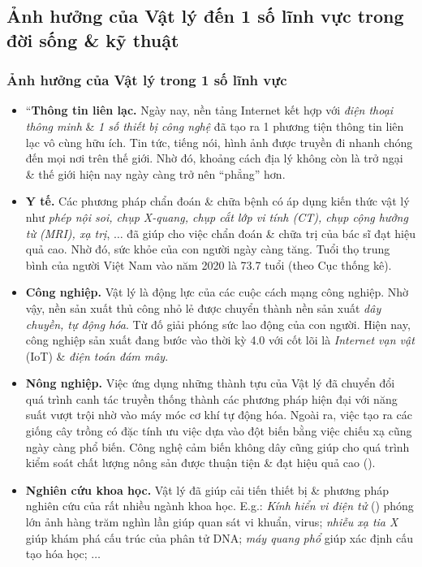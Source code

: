 \documentclass[oneside]{book}
\numberwithin{equation}{section}
\begin{document}
\subsection{Ảnh hưởng của Vật lý đến 1 số lĩnh vực trong đời sống \& kỹ thuật}

\subsubsection{Ảnh hưởng của Vật lý trong 1 số lĩnh vực}
\begin{itemize}
	\item ``\textbf{Thông tin liên lạc.} Ngày nay, nền tảng Internet kết hợp với \textit{điện thoại thông minh} \& \textit{1 số thiết bị công nghệ} đã tạo ra 1 phương tiện thông tin liên lạc vô cùng hữu ích. Tin tức, tiếng nói, hình ảnh được truyền đi nhanh chóng đến mọi nơi trên thế giới. Nhờ đó, khoảng cách địa lý không còn là trở ngại \& thế giới hiện nay ngày càng trở nên ``phẳng'' hơn.
	\item \textbf{Y tế.} Các phương pháp chẩn đoán \& chữa bệnh có áp dụng kiến thức vật lý như \textit{phép nội soi, chụp X-quang, chụp cắt lớp vi tính (CT), chụp cộng hưởng từ (MRI), xạ trị}, $\ldots$ đã giúp cho việc chẩn đoán \& chữa trị của bác sĩ đạt hiệu quả cao. Nhờ đó, sức khỏe của con người ngày càng tăng. Tuổi thọ trung bình của người Việt Nam vào năm 2020 là 73.7 tuổi (theo Cục thống kê).
	\item \textbf{Công nghiệp.} Vật lý là động lực của các cuộc cách mạng công nghiệp. Nhờ vậy, nền sản xuất thủ công nhỏ lẻ được chuyển thành nền sản xuất \textit{dây chuyền, tự động hóa}. Từ đố giải phóng sức lao động của con người. Hiện nay, công nghiệp sản xuất đang bước vào thời kỳ 4.0 với cốt lõi là \textit{Internet vạn vật} (IoT) \& \textit{điện toán đám mây}.
	\item \textbf{Nông nghiệp.} Việc ứng dụng những thành tựu của Vật lý đã chuyển đổi quá trình canh tác truyền thống thành các phương pháp hiện đại với năng suất vượt trội nhờ vào máy móc cơ khí tự động hóa. Ngoài ra, việc tạo ra các giống cây trồng có đặc tính ưu việc dựa vào đột biến bằng việc chiếu xạ cũng ngày càng phổ biến. Công nghệ cảm biến không dây cũng giúp cho quá trình kiểm soát chất lượng nông sản được thuận tiện \& đạt hiệu quả cao (\cite[Hình 1.6: \textsf{Công nghệ cảm biến trong việc kiểm soát chất lượng nông sản.}, p. 10]{SGK_Vat_Ly_10_Chan_Troi_Sang_Tao}).
	\item \textbf{Nghiên cứu khoa học.} Vật lý đã giúp cải tiến thiết bị \& phương pháp nghiên cứu của rất nhiều ngành khoa học. E.g.: \textit{Kính hiển vi điện tử} (\cite[Hình 1.7: \textsf{Kính hiển vi điện tử}, p. 10]{SGK_Vat_Ly_10_Chan_Troi_Sang_Tao}) phóng lớn ảnh hàng trăm nghìn lần giúp quan sát vi khuẩn, virus; \textit{nhiễu xạ tia X} giúp khám phá cấu trúc của phân tử DNA; \textit{máy quang phổ} giúp xác định cấu tạo hóa học; $\ldots$
	

\end{itemize}
\end{document}
